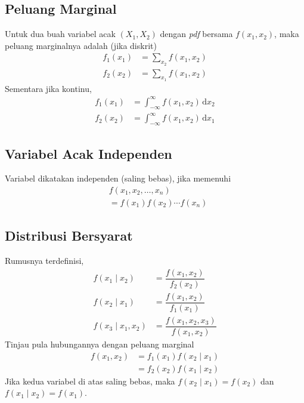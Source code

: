 \documentclass[extrafontsizes, 9pt]{memoir}
\begin{document}
\begin{multicols}{3}
			\subsection*{\small Peluang Marginal}
				Untuk dua buah variabel acak $\left(X_{1}, X_{2}\right)$ dengan \textsl{pdf} bersama $f\left(x_{1}, x_{2}\right)$, maka peluang marginalnya adalah (jika diskrit)
					\begin{align*}
						f_{1}\left(x_{1}\right) & = \sum_{x_{2}}f\left(x_{1}, x_{2}\right)\\
						f_{2}\left(x_{2}\right) & = \sum_{x_{1}}f\left(x_{1}, x_{2}\right)
					\end{align*}
				Sementara jika kontinu,
					\begin{align*}
						f_{1}\left(x_{1}\right) & = \int_{-\infty}^{\infty}f\left(x_{1}, x_{2}\right)\, \mathrm{d}x_{2}\\
						f_{2}\left(x_{2}\right) & = \int_{-\infty}^{\infty}f\left(x_{1}, x_{2}\right)\, \mathrm{d}x_{1}
					\end{align*}
					
			\subsection*{\small Variabel Acak Independen}
				Variabel dikatakan independen (saling bebas), jika memenuhi
					\begin{align*}
						& f\left(x_{1}, x_{2}, \ldots, x_{n}\right)\\
						& = f\left(x_{1}\right)f\left(x_{2}\right)\cdots f\left(x_{n}\right)
					\end{align*}
			
			\subsection*{\small Distribusi Bersyarat}
				Rumusnya terdefinisi,
					\begin{align*}
						f\left(x_{1} \mid x_{2}\right) & = \dfrac{f\left(x_{1}, x_{2}\right)}{f_{2}\left(x_{2}\right)}\\
						f\left(x_{2} \mid x_{1}\right) & = \dfrac{f\left(x_{1}, x_{2}\right)}{f_{1}\left(x_{1}\right)}\\
						f\left(x_{3} \mid x_{1}, x_{2}\right) & = \dfrac{f\left(x_{1}, x_{2}, x_{3}\right)}{f\left(x_{1}, x_{2}\right)}
					\end{align*}
				Tinjau pula hubungannya dengan peluang marginal
					\begin{align*}
						f\left(x_{1}, x_{2}\right) & = f_{1}\left(x_{1}\right)f\left(x_{2} \mid x_{1}\right)\\
						& = f_{2}\left(x_{2}\right)f\left(x_{1} \mid x_{2}\right)
					\end{align*}
				Jika kedua variabel di atas saling bebas, maka $f(x_{2} \mid x_{1}) = f(x_{2})$ dan $f(x_{1} \mid x_{2}) = f(x_{1})$.
		

\end{multicols}
\end{document}

